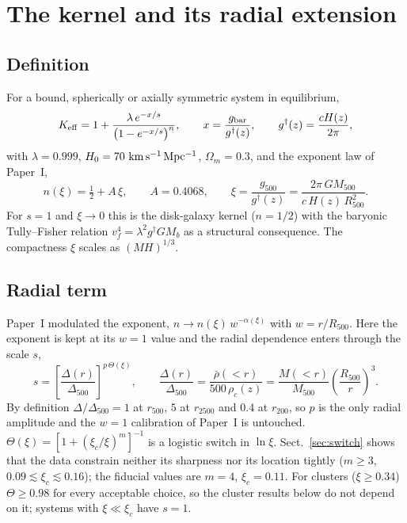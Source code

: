 \documentclass[11pt,a4paper]{article}
\newcommand{\gdag}{g^{\dagger}}
\newcommand{\Keff}{K_{\rm eff}}
\begin{document}
\section{The kernel and its radial extension}
\label{sec:model}
\subsection{Definition}
For a bound, spherically or axially symmetric system in equilibrium,
\begin{equation}
\Keff = 1+\frac{\lambda\,e^{-x/s}}{\left(1-e^{-x/s}\right)^{n}},\qquad x=\frac{g_{\rm bar}}{\gdag(z)},\qquad \gdag(z)=\frac{cH(z)}{2\pi},
\label{eq:K}
\end{equation}
with $\lambda=0.999$, $H_0=70\ {\rm km\,s^{-1}\,Mpc^{-1}}$, $\Omega_m=0.3$, and the exponent law of Paper~I,
\begin{equation}
n(\xi)=\tfrac12+A\,\xi,\qquad A=0.4068,\qquad \xi=\frac{g_{500}}{\gdag(z)}=\frac{2\pi\,G M_{500}}{c\,H(z)\,R_{500}^2}.
\label{eq:n}
\end{equation}
For $s=1$ and $\xi\to0$ this is the disk-galaxy kernel ($n=1/2$) with the baryonic Tully--Fisher relation $v_f^4=\lambda^2\gdag G M_b$ as a structural consequence. The compactness $\xi$ scales as $(MH)^{1/3}$.

\subsection{Radial term}
Paper~I modulated the exponent, $n\to n(\xi)\,w^{-\alpha(\xi)}$ with $w=r/R_{500}$. Here the exponent is kept at its $w=1$ value and the radial dependence enters through the scale $s$,
\begin{equation}
s=\left[\frac{\Delta(r)}{\Delta_{500}}\right]^{p\,\Theta(\xi)},\qquad \frac{\Delta(r)}{\Delta_{500}}=\frac{\bar\rho(<r)}{500\,\rho_c(z)}=\frac{M(<r)}{M_{500}}\left(\frac{R_{500}}{r}\right)^{3}.
\label{eq:s}
\end{equation}
By definition $\Delta/\Delta_{500}=1$ at $r_{500}$, $5$ at $r_{2500}$ and $0.4$ at $r_{200}$, so $p$ is the only radial amplitude and the $w=1$ calibration of Paper~I is untouched. $\Theta(\xi)=[1+(\xi_c/\xi)^m]^{-1}$ is a logistic switch in $\ln\xi$. Sect.~\ref{sec:switch} shows that the data constrain neither its sharpness nor its location tightly ($m\ge3$, $0.09\lesssim\xi_c\lesssim0.16$); the fiducial values are $m=4$, $\xi_c=0.11$. For clusters ($\xi\ge0.34$) $\Theta\ge0.98$ for every acceptable choice, so the cluster results below do not depend on it; systems with $\xi\ll\xi_c$ have $s=1$.
\end{document}
